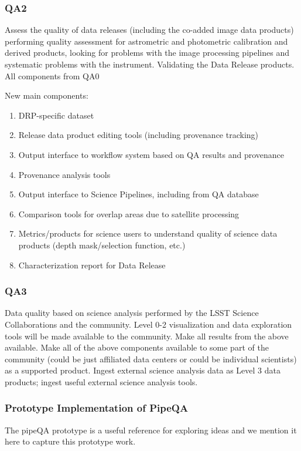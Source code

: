 \subsubsection{QA2}
Assess the quality of data releases (including the co-added image data products) performing quality assessment for astrometric and photometric calibration and derived products, looking for problems with the image processing pipelines and systematic problems with the instrument.
Validating the Data Release products.
All components from QA0

New main components:
\begin{enumerate}
\item DRP-specific dataset
\item Release data product editing tools (including provenance tracking)
\item Output interface to workflow system based on QA results and provenance
\item Provenance analysis tools
\item Output interface to Science Pipelines, including from QA database
\item Comparison tools for overlap areas due to satellite processing
\item Metrics/products for science users to understand quality of science data products (depth mask/selection function, etc.)
\item Characterization report for Data Release
\end{enumerate}

\subsubsection{QA3}
Data quality based on science analysis performed by the LSST Science Collaborations and the community. Level 0-2 visualization and data exploration tools will be made available to the community.
Make all results from the above available. Make all of the above components available to some part of the community (could be just affiliated data centers or could be individual scientists) as a supported product.
Ingest external science analysis data as Level 3 data products; ingest useful external science analysis tools.

\subsubsection{Prototype Implementation of PipeQA}

The pipeQA prototype is a useful reference for exploring ideas and we mention
it here to capture this prototype work.

